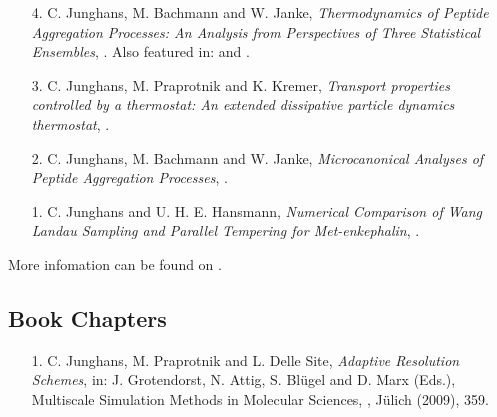 \documentclass{article}
\begin{document}
\begin{enumerate}
\item[4.] C. Junghans, M. Bachmann and W. Janke,
  \textit{Thermodynamics of Peptide Aggregation Processes: An Analysis from Perspectives of Three Statistical Ensembles},
   .
  Also featured in:  and .

\item[3.] C. Junghans, M. Praprotnik and K. Kremer,
  \textit{Transport properties controlled by a thermostat: An extended dissipative particle dynamics thermostat},
  .

\item[2.] C. Junghans, M. Bachmann and W. Janke,
  \textit{Microcanonical Analyses of Peptide Aggregation Processes},
  .

\item[1.] C. Junghans and U. H. E. Hansmann,
  \textit{Numerical Comparison of Wang Landau Sampling and Parallel Tempering for Met-enkephalin}, 
  .
\end{enumerate}

More infomation can be found on .

\subsection*{Book Chapters}

\begin{enumerate}
\item[1.] C. Junghans, M. Praprotnik and L. Delle Site,
  \textit{Adaptive Resolution Schemes},
  in: J. Grotendorst, N. Attig, S. Bl{\"u}gel and D. Marx (Eds.),
  Multiscale Simulation Methods in Molecular Sciences, , J{\"u}lich (2009), 359.
\end{enumerate}
\end{document}
